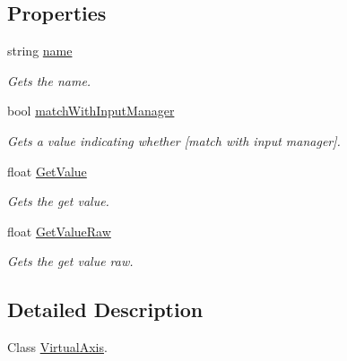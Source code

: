 \subsection*{Properties}
\begin{DoxyCompactItemize}
\item 
string \hyperlink{class_lerp2_assets_1_1_cross_platform_input_1_1_cross_platform_input_manager_1_1_virtual_axis_afe53ae5555c8ef0901ae2fca3a3da6f0}{name}
\begin{DoxyCompactList}\small\item\em Gets the name. \end{DoxyCompactList}\item 
bool \hyperlink{class_lerp2_assets_1_1_cross_platform_input_1_1_cross_platform_input_manager_1_1_virtual_axis_a62aee300887ea39660f537b33993dade}{match\+With\+Input\+Manager}
\begin{DoxyCompactList}\small\item\em Gets a value indicating whether \mbox{[}match with input manager\mbox{]}. \end{DoxyCompactList}\item 
float \hyperlink{class_lerp2_assets_1_1_cross_platform_input_1_1_cross_platform_input_manager_1_1_virtual_axis_afbdf6598a38442ca41c8b537ff6a00f7}{Get\+Value}
\begin{DoxyCompactList}\small\item\em Gets the get value. \end{DoxyCompactList}\item 
float \hyperlink{class_lerp2_assets_1_1_cross_platform_input_1_1_cross_platform_input_manager_1_1_virtual_axis_a849d2b57a72c6da31f08d5c9c5b6189a}{Get\+Value\+Raw}
\begin{DoxyCompactList}\small\item\em Gets the get value raw. \end{DoxyCompactList}\end{DoxyCompactItemize}


\subsection{Detailed Description}
Class \hyperlink{class_lerp2_assets_1_1_cross_platform_input_1_1_cross_platform_input_manager_1_1_virtual_axis}{Virtual\+Axis}. 




